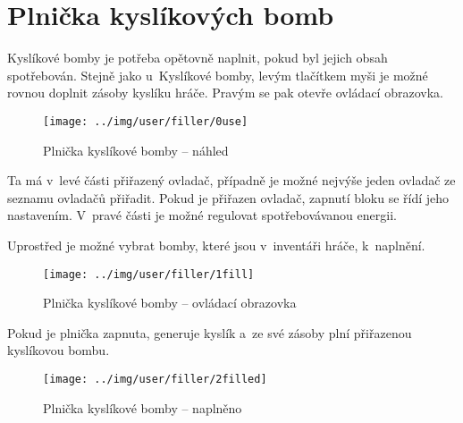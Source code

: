 
\section{Plnička kyslíkových bomb}

Kyslíkové bomby je potřeba opětovně naplnit, pokud byl jejich obsah spotřebován. Stejně jako u~Kyslíkové bomby, levým tlačítkem myši je možné rovnou doplnit zásoby kyslíku hráče. Pravým se pak otevře ovládací obrazovka.

\begin{figure}[!ht]\centering
\texttt{[image: ../img/user/filler/0use]}

\caption{Plnička kyslíkové bomby -- náhled}
\label{fig:user_filler_0use}

\end{figure}

\FloatBarrier

Ta má v~levé části přiřazený ovladač, případně je možné nejvýše jeden ovladač ze seznamu ovladačů přiřadit. Pokud je přiřazen ovladač, zapnutí bloku se řídí jeho nastavením. V~pravé části je možné regulovat spotřebovávanou energii.

Uprostřed je možné vybrat bomby, které jsou v~inventáři hráče, k~naplnění.

\begin{figure}[!ht]\centering
\texttt{[image: ../img/user/filler/1fill]}

\caption{Plnička kyslíkové bomby -- ovládací obrazovka}
\label{fig:user_filler_1fill}

\end{figure}

\FloatBarrier

Pokud je plnička zapnuta, generuje kyslík a~ze své zásoby plní přiřazenou kyslíkovou bombu.

\begin{figure}[!ht]\centering
\texttt{[image: ../img/user/filler/2filled]}

\caption{Plnička kyslíkové bomby -- naplněno}
\label{fig:user_filler_2filled}

\end{figure}



\FloatBarrier